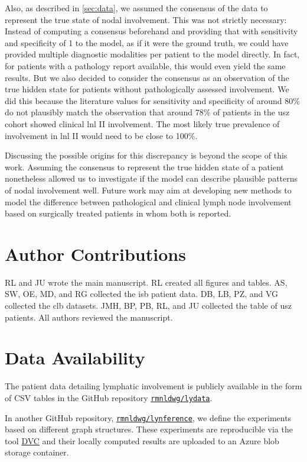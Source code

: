 \documentclass[twocolumn]{aastex631}
\begin{document}
Also, as described in \autoref{sec:data}, we assumed the consensus of the data to represent the true state of nodal involvement. This was not strictly necessary: Instead of computing a consensus beforehand and providing that with sensitivity and specificity of 1 to the model, as if it were the ground truth, we could have provided multiple diagnostic modalities per patient to the model directly. In fact, for patients with a pathology report available, this would even yield the same results. But we also decided to consider the consensus as an observation of the true hidden state for patients without pathologically assessed involvement. We did this because the literature values for sensitivity and specificity of around 80\% do not plausibly match the observation that around 78\% of patients in the \gls{usz} cohort showed clinical \gls{lnl} II involvement. The most likely true prevalence of involvement in \gls{lnl} II would need to be close to 100\%.

Discussing the possible origins for this discrepancy is beyond the scope of this work. Assuming the consensus to represent the true hidden state of a patient nonetheless allowed us to investigate if the model can describe plausible patterns of nodal involvement well. Future work may aim at developing new methods to model the difference between pathological and clinical lymph node involvement based on surgically treated patients in whom both is reported.


\section*{Author Contributions}

RL and JU wrote the main manuscript. RL created all figures and tables. AS, SW, OE, MD, and RG collected the \gls{isb} patient data. DB, LB, PZ, and VG collected the \gls{clb} datasets. JMH, BP, PB, RL, and JU collected the table of \gls{usz} patients. All authors reviewed the manuscript.


\section*{Data Availability}

The patient data detailing lymphatic involvement is publicly available in the form of CSV tables in the GitHub repository \href{https://github.com/rmnldwg/lydata}{\texttt{rmnldwg/lydata}}.

In another GitHub repository, \href{https://github.com/rmnldwg/lynference}{\texttt{rmnldwg/lynference}}, we define the experiments based on different graph structures. These experiments are reproducible via the tool \href{https://dvc.org}{DVC} and their locally computed results are uploaded to an Azure blob storage container.
\end{document}
